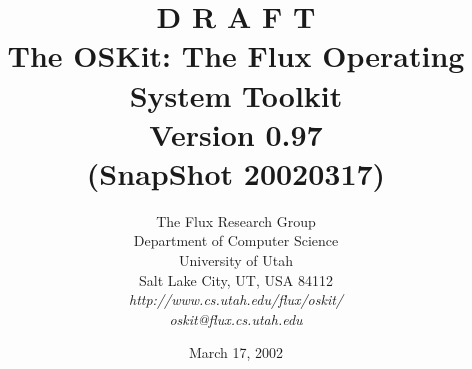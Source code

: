 %
% 
%

\ifwww
  \usepackage[tex4ht,html,2]{tex4ht}
\fi
\usepackage{graphicx}
\usepackage{hyperref}

\newcommand{\oskitversion}{0.97}

\ifwww
  \newcommand{\oskittitledraft}{D R A F T \\}
\else
  \newcommand{\oskittitledraft}{\texttt{D~R~A~F~T}\\[5ex]}
\fi
\title{\oskittitledraft
The OSKit: The Flux Operating System Toolkit\\
Version \oskitversion\\
(SnapShot 20020317)}

\author{The Flux Research Group \\[1ex]
	Department of Computer Science \\
	University of Utah \\[1ex]
	{\normalsize Salt Lake City, UT, USA 84112} \\[2ex]
	{\small	\em {}%
		{http://www.cs.utah.edu/flux/oskit/}} \\
	{\small \em oskit@flux.cs.utah.edu}
}

\date{March 17, 2002}

\makeatletter
\gdef\@oskitcopyright@begin{}
\gdef\@oskitcopyright@end{}
\gdef\@oskitcopyright{}
\def\oskitcopyrightbegin#1{\gdef\@oskitcopyright@begin{#1}}
\def\oskitcopyrightend#1{\gdef\@oskitcopyright@end{#1}}
\def\oskitcopyright#1{\gdef\@oskitcopyright{#1}}
\makeatother

\oskitcopyright{%
Copyright \copyright\ 1996-2002, University of Utah.  All rights reserved.
The University of Utah grants you the right to copy and reproduce this
document or portions thereof for academic, research, evaluation, and
personal use only, provided that this title page appears prominently.
To arrange for alternate terms, contact the University at csl-dist@cs.utah.edu
or +1-801-585-3271.}

